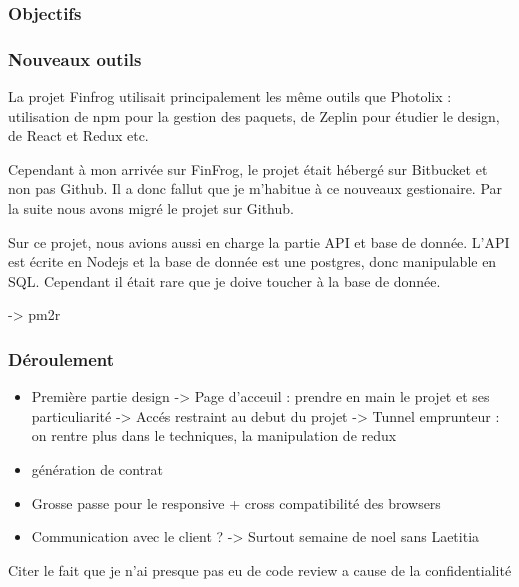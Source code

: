 \subsubsection{Objectifs}\label{objectifs-1}

\subsubsection{Nouveaux outils}\label{nouveaux-outils}

\bigskip

La projet Finfrog utilisait principalement les même outils que Photolix
: utilisation de npm pour la gestion des paquets, de Zeplin pour étudier
le design, de React et Redux etc.

\bigskip

Cependant à mon arrivée sur FinFrog, le projet était hébergé sur
Bitbucket et non pas Github. Il a donc fallut que je m'habitue à ce
nouveaux gestionaire. Par la suite nous avons migré le projet sur
Github.

\bigskip

Sur ce projet, nous avions aussi en charge la partie API et base de
donnée. L'API est écrite en Nodejs et la base de donnée est une
postgres, donc manipulable en SQL. Cependant il était rare que je doive
toucher à la base de donnée.

\bigskip

-\textgreater{} pm2r

\subsubsection{Déroulement}\label{duxe9roulement-1}

\begin{itemize}
\item
  Première partie design -\textgreater{} Page d'acceuil : prendre en
  main le projet et ses particuliarité -\textgreater{} Accés restraint
  au debut du projet -\textgreater{} Tunnel emprunteur : on rentre plus
  dans le techniques, la manipulation de redux
\item
  génération de contrat
\item
  Grosse passe pour le responsive + cross compatibilité des browsers
\item
  Communication avec le client ? -\textgreater{} Surtout semaine de noel
  sans Laetitia
\end{itemize}

Citer le fait que je n'ai presque pas eu de code review a cause de la
confidentialité


